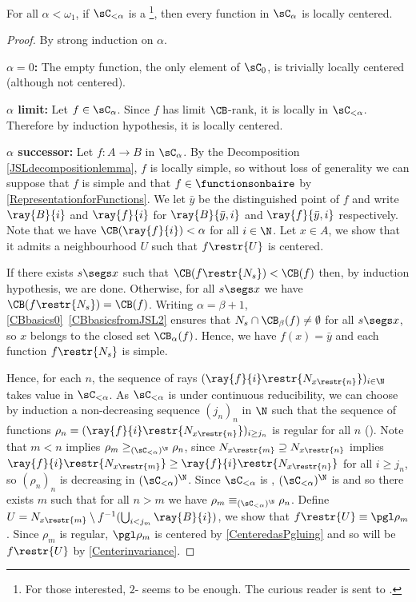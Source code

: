 \begin{theorem}\label{LocalCenterednessFromBQO}
For all $\alpha<\omega_1$, if $\sC_{<\alpha}$ is a \bqo{}\footnote{For those interested, $2$-\bqo{} seems to be enough. The curious reader is sent to \cite[Definition 4.1]{wellbetterinbetween}.},
then every function in $\sC_\alpha$ is locally centered.
\end{theorem}
\begin{proof}
By strong induction on $\alpha$. 

\textbf{$\alpha=0$:} The empty function, the only element of $\sC_{0}$, is trivially locally centered (although not centered).

\textbf{$\alpha$ limit:} Let $f\in \sC_{\alpha}$. Since $f$ has limit $\CB$-rank, it is locally in $\sC_{<\alpha}$. Therefore by induction hypothesis, it is locally centered.

\textbf{$\alpha$ successor:} Let $f:A\to B$ in $\sC_{\alpha}$. By the Decomposition \cref{JSLdecompositionlemma}, $f$ is locally simple,
so without loss of generality we can suppose that $f$ is simple and that $f\in\functionsonbaire$ by \cref{RepresentationforFunctions}. We let $\bar{y}$ be the distinguished point of $f$
and write $\ray{B}{i}$ and $\ray{f}{i}$ for $\ray{B}{\bar{y},i}$ and $\ray{f}{\bar{y},i}$ respectively. Note that we have $\CB(\ray{f}{i})< \alpha$ for all $i\in \N$.
Let $x\in A$, we show that it admits a neighbourhood $U$ such that $f\restr{U}$ is centered.

If there exists $s\segs x$ such that $\CB(f\restr{N_s})<\CB(f)$ then, by induction hypothesis, we are done.
Otherwise, for all $s\segs x$ we have $\CB(f\restr{N_s})=\CB(f)$.
Writing $\alpha=\beta+1$, \cref{CBbasics0}~\cref{CBbasicsfromJSL2} ensures that $N_s\cap \CB_{\beta}(f)\neq \emptyset$ for all $s\segs x$,
so $x$ belongs to the closed set $\CB_{\alpha}(f)$. Hence, we have $f(x)=\bar{y}$ and each function $f\restr{N_s}$ is simple.

Hence, for each $n$, the sequence of rays $(\ray{f}{i}\restr{N_{x\restr{n}}})_{i\in\N}$ takes value in $\sC_{<\alpha}$.
As $\sC_{<\alpha}$ is \wqo{} under continuous reducibility, we can choose by induction a non-decreasing sequence $(j_n)_n$ in $\N$
such that the sequence of functions $\rho_n=(\ray{f}{i}\restr{N_{x\restr{n}}})_{i\geq j_n}$ is regular for all $n$ (\cite[Proposition 2.9]{yann2017towardsbetter}).
Note that $m<n$ implies $\rho_m\geq_{(\sC_{<\alpha})^\N} \rho_n$, since $N_{x\restr{m}}\supseteq N_{x\restr{n}}$ implies $\ray{f}{i}\restr{N_{x\restr{m}}}\geq \ray{f}{i}\restr{N_{x\restr{n}}}$ for all $i\geq j_n$,
so $(\rho_n)_n$ is decreasing in $(\sC_{<\alpha})^\N$.
Since $\sC_{<\alpha}$ is \bqo{}, $(\sC_{<\alpha})^\N$ is \wqo{} and so there exists $m$ such that for all $n>m$ we have $\rho_m\equiv_{(\sC_{<\alpha})^\N} \rho_n$.
Define $U=N_{x\restr{m}}\setminus f^{-1}(\bigcup_{i<{j_m}}\ray{B}{i})$, we show that $f\restr{U}\equiv \pgl \rho_m$. 
Since $\rho_m$ is regular, $\pgl \rho_m$ is centered by \cref{CenteredasPgluing} and so will be $f\restr{U}$ by \cref{Centerinvariance}.


\end{proof}
